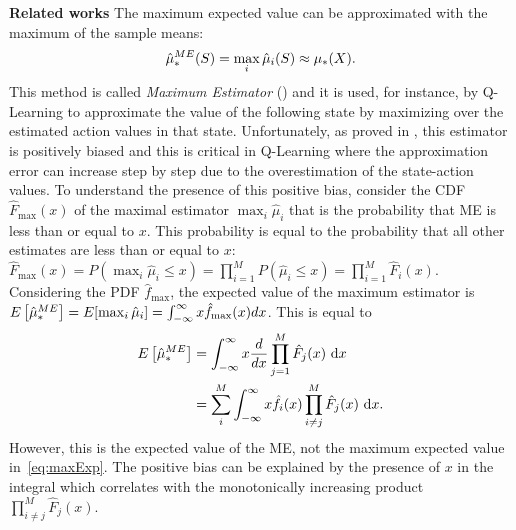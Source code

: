 \textbf{Related works} The maximum expected value can be approximated with the maximum of the sample means:
\begin{equation}\label{E:biasME}
\hat\mu_*^{ME}(S) = \max_{i}\hat{\mu}_{i}(S) \approx \mu_{*}(X).
\end{equation}
This method is called \textit{Maximum Estimator} (\ME) and it is used, for instance, by Q-Learning to approximate the value of the following state by maximizing over the estimated action values in that state. Unfortunately, as proved in \cite{smith2006optimizer}, this estimator is positively biased and this is critical in Q-Learning where the approximation error can increase step by step due to the overestimation of the state-action values. To understand the presence of this positive bias, consider the CDF $\hat{F}_{\max}(x)$ of the maximal estimator $\max_{i}\hat\mu_{i}$ that is the probability that ME is less than or equal to $x$. This probability is equal to the probability that all other estimates are less than or equal to $x$: $\hat F_{\max}(x) = P(\max_{i}\hat\mu_{i} \leq x) = \prod^M_{i=1} P(\hat\mu_{i} \leq x) = \prod^M_{i=1} \hat F_i(x)$. Considering the PDF $\hat f_{\max}$, the expected value of the maximum estimator is $E\left[\hat\mu_*^{ME}\right] = E [ \max_{i}\hat\mu_{i} ] = \int^{\infty}_{-\infty} x \hat f_{\max}(x) dx$. This is equal to
\begin{align}
E\left[\hat\mu_*^{ME}\right] &= \int^{\infty}_{-\infty} x \frac{d}{dx} \prod^M_{j=1} \hat F_j(x)~\mathrm{d}x \nonumber \\ 
&=\sum^M_i \int^{\infty}_{-\infty} x \hat f_i(x) \prod^M_{i \neq j} \hat F_j(x)~\mathrm{d}x.
\end{align}
However, this is the expected value of the ME, not the maximum expected value in~\eqref{eq:maxExp}. The positive bias can be explained by the presence of $x$ in the integral which correlates with the monotonically increasing product $\prod^M_{i \neq j} \hat F_j(x)$.

